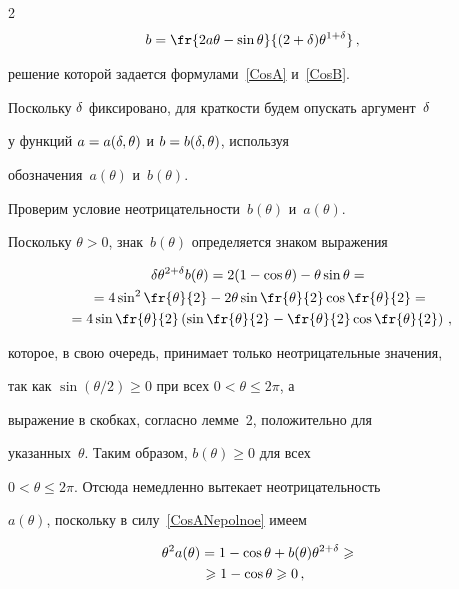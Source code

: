 \begin{multicols}{2}
\begin{align}
b&=\fr{2a\theta-\sin\theta}{(2+\d)\theta^{1+\d}}\,,

\label{CosBNepolnoe}

\end{align}

решение которой задается формулами~\eqref{CosA} и~\eqref{CosB}.

Поскольку $\delta$ фиксировано, для краткости будем опускать аргумент~$\delta$

у функций $a=a(\delta,\theta)$ и $b=b(\delta,\theta)$, используя

обозначения~$a(\theta)$ и~$b(\theta)$.



Проверим условие неотрицательности~$b(\theta)$ и~$a(\theta)$.

Поскольку $\theta>0$, знак~$b(\theta)$ определяется знаком выражения

\begin{multline*}

\d\theta^{2+\d}b(\theta)=2(1-\cos \theta)-\theta\sin\theta={}\\

{}=

4\sin^2\fr {\theta}{2}-2\theta\sin\fr{\theta}{2}\cos\fr{\theta}{2}={}\\

{}=

4\sin\fr{\theta}{2}

\left(\sin\fr{\theta}{2}-\fr{\theta}{2}\cos\fr{\theta}{2}\right)\,,

\end{multline*}

которое, в свою очередь, принимает только неотрицательные значения,

так как ${\sin(\theta/2)\ge0}$ при всех ${0<\theta\le2\pi}$, а

выражение в скобках, согласно лемме~2, положительно для

указанных~$\theta$. Таким образом, ${b(\theta)\ge0}$ для всех

${0<\theta\le2\pi}$. Отсюда немедленно вытекает неотрицательность

$a(\theta)$, поскольку в силу~\eqref{CosANepolnoe} имеем

\begin{multline*}

\theta^2 a(\theta)=

1-\cos\theta+b(\theta)\theta^{2+\d}\ge{}\\

{}\ge 1-\cos\theta\ge0\,,\quad


\end{multline*}
\end{multicols}

